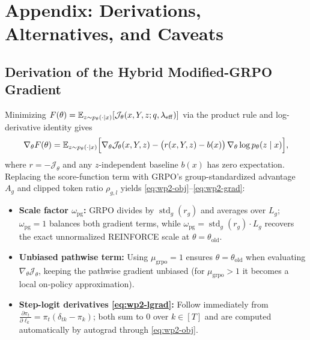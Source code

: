 \documentclass[10pt,a4paper]{article}
\begin{document}
\clearpage
\appendix
\section{Appendix: Derivations, Alternatives, and Caveats}

\subsection{Derivation of the Hybrid Modified-GRPO Gradient} \label{app:wp2-grad}
Minimizing $F(\theta) = \mathbb{E}_{z\sim p_\theta(\cdot\mid x)}[\mathcal{J}_\theta(x,Y,z;q,\lambda_{\mathrm{eff}})]$ via the product rule and log-derivative identity gives
\[
\nabla_\theta F(\theta) = \mathbb{E}_{z\sim p_\theta(\cdot\mid x)}\Big[\nabla_\theta \mathcal{J}_\theta(x,Y,z) - \big(r(x,Y,z) - b(x)\big)\,\nabla_\theta\log p_\theta(z\mid x)\Big],
\]
where $r=-\mathcal{J}_\theta$ and any $z$-independent baseline $b(x)$ has zero expectation. Replacing the score-function term with GRPO's group-standardized advantage $A_g$ and clipped token ratio $\rho_{g,l}$ yields \eqref{eq:wp2-obj}--\eqref{eq:wp2-grad}:
\begin{itemize}
\item \textbf{Scale factor $\omega_{\mathrm{pg}}$:} GRPO divides by $\operatorname{std}_g(r_g)$ and averages over $L_g$; $\omega_{\mathrm{pg}}=1$ balances both gradient terms, while $\omega_{\mathrm{pg}}=\operatorname{std}_g(r_g)\cdot L_g$ recovers the exact unnormalized REINFORCE scale at $\theta=\theta_{\mathrm{old}}$.
\item \textbf{Unbiased pathwise term:} Using $\mu_{\mathrm{grpo}}=1$ ensures $\theta=\theta_{\mathrm{old}}$ when evaluating $\nabla_\theta\mathcal{J}_\theta$, keeping the pathwise gradient unbiased (for $\mu_{\mathrm{grpo}}>1$ it becomes a local on-policy approximation).
\item \textbf{Step-logit derivatives \eqref{eq:wp2-lgrad}:} Follow immediately from $\frac{\partial\pi_t}{\partial\ell_k}=\pi_t(\delta_{tk}-\pi_k)$; both sum to $0$ over $k\in[T]$ and are computed automatically by autograd through \eqref{eq:wp2-obj}.
\end{itemize}
\end{document}
